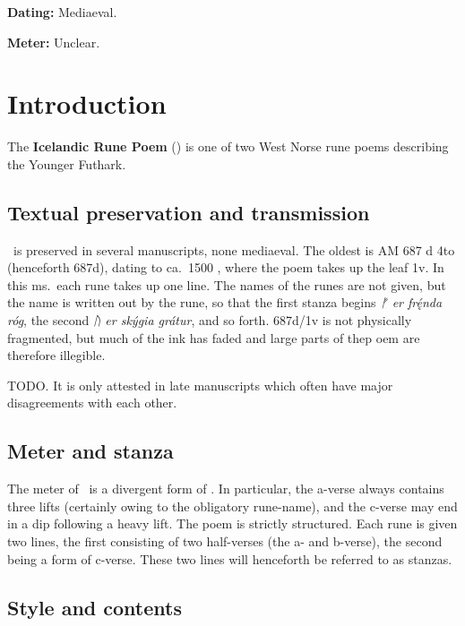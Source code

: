 
\begin{flushright}%
\textbf{Dating:} Mediaeval.%

\textbf{Meter:} Unclear.
\end{flushright}%

\section{Introduction}

The \textbf{Icelandic Rune Poem} (\IcelandicRunePoem) is one of two West Norse rune poems describing the Younger Futhark.

\subsection{Textual preservation and transmission}

\IcelandicRunePoem\ is preserved in several manuscripts, none mediaeval.  The oldest is AM 687 d 4to (henceforth 687d), dating to ca.~1500 \ce, where the poem takes up the leaf 1v.  In this ms.~each rune takes up one line.  The names of the runes are not given, but the name is written out by the rune, so that the first stanza begins \emph{ᚠ er frę́nda róg}, the second \emph{ᚢ er skýgia grátur}, and so forth.  687d/1v is not physically fragmented, but much of the ink has faded and large parts of thep oem are therefore illegible.

TODO.  It is only attested in late manuscripts which often have major disagreements with each other.

\subsection{Meter and stanza}

The meter of \IcelandicRunePoem\ is a divergent form of \Ljodahattr.  In particular, the a-verse always contains three lifts (certainly owing to the obligatory rune-name), and the c-verse may end in a dip following a heavy lift.
The poem is strictly structured.  Each rune is given two lines, the first consisting of two half-verses (the a- and b-verse), the second being a form of c-verse.  These two lines will henceforth be referred to as stanzas.

\subsection{Style and contents}

